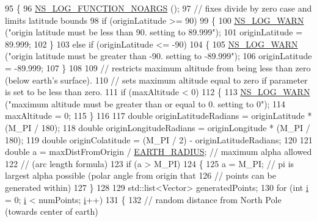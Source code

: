 \begin{DoxyCode}
95 \{
96   \hyperlink{log-macros-disabled_8h_a8f7e4afc291c9d29a65c18ac1f79197b}{NS\_LOG\_FUNCTION\_NOARGS} ();
97   \textcolor{comment}{// fixes divide by zero case and limits latitude bounds}
98   \textcolor{keywordflow}{if} (originLatitude >= 90)
99     \{
100       \hyperlink{group__logging_gade7208b4009cdf0e25783cd26766f559}{NS\_LOG\_WARN} (\textcolor{stringliteral}{"origin latitude must be less than 90. setting to 89.999"});
101       originLatitude = 89.999;
102     \}
103   \textcolor{keywordflow}{else} \textcolor{keywordflow}{if} (originLatitude <= -90)
104     \{
105       \hyperlink{group__logging_gade7208b4009cdf0e25783cd26766f559}{NS\_LOG\_WARN} (\textcolor{stringliteral}{"origin latitude must be greater than -90. setting to -89.999"});
106       originLatitude = -89.999;
107     \}
108 
109   \textcolor{comment}{// restricts maximum altitude from being less than zero (below earth's surface).}
110   \textcolor{comment}{// sets maximum altitude equal to zero if parameter is set to be less than zero.}
111   \textcolor{keywordflow}{if} (maxAltitude < 0)
112     \{
113       \hyperlink{group__logging_gade7208b4009cdf0e25783cd26766f559}{NS\_LOG\_WARN} (\textcolor{stringliteral}{"maximum altitude must be greater than or equal to 0. setting to 0"});
114       maxAltitude = 0;
115     \}
116 
117   \textcolor{keywordtype}{double} originLatitudeRadians = originLatitude * (M\_PI / 180);
118   \textcolor{keywordtype}{double} originLongitudeRadians = originLongitude * (M\_PI / 180);
119   \textcolor{keywordtype}{double} originColatitude = (M\_PI / 2) - originLatitudeRadians;
120 
121   \textcolor{keywordtype}{double} a = maxDistFromOrigin / \hyperlink{namespacens3_acd9e5214ec8a357ee2eb37cde6bd58f3}{EARTH\_RADIUS}; \textcolor{comment}{// maximum alpha allowed }
122                                                \textcolor{comment}{// (arc length formula)}
123   \textcolor{keywordflow}{if} (a > M\_PI)
124     \{
125       a = M\_PI; \textcolor{comment}{// pi is largest alpha possible (polar angle from origin that }
126                 \textcolor{comment}{// points can be generated within)}
127     \}
128   
129   std::list<Vector> generatedPoints;
130   \textcolor{keywordflow}{for} (\textcolor{keywordtype}{int} \hyperlink{bernuolliDistribution_8m_a6f6ccfcf58b31cb6412107d9d5281426}{i} = 0; \hyperlink{bernuolliDistribution_8m_a6f6ccfcf58b31cb6412107d9d5281426}{i} < numPoints; \hyperlink{bernuolliDistribution_8m_a6f6ccfcf58b31cb6412107d9d5281426}{i}++)
131     \{
132       \textcolor{comment}{// random distance from North Pole (towards center of earth)}

\end{DoxyCode}
